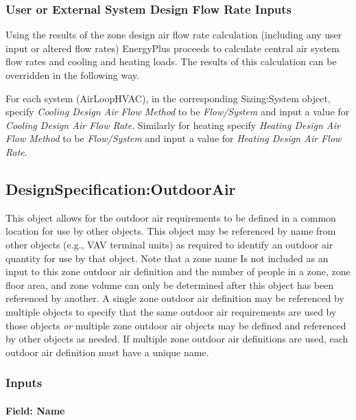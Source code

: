 \subsubsection{User or External System Design Flow Rate Inputs}\label{user-or-external-system-design-flow-rate-inputs}

Using the results of the zone design air flow rate calculation (including any user input or altered flow rates) EnergyPlus proceeds to calculate central air system flow rates and cooling and heating loads. The results of this calculation can be overridden in the following way.

For each system (AirLoopHVAC), in the corresponding Sizing:System object, specify \emph{Cooling Design Air Flow Method} to be \emph{Flow/System} and input a value for \emph{Cooling Design Air Flow Rate}. Similarly for heating specify \emph{Heating Design Air Flow Method} to be \emph{Flow/System} and input a value for \emph{Heating Design Air Flow Rate}.

\subsection{DesignSpecification:OutdoorAir}\label{designspecificationoutdoorair}

This object allows for the outdoor air requirements to be defined in a common location for use by other objects. This object may be referenced by name from other objects (e.g., VAV terminal units) as required to identify an outdoor air quantity for use by that object. Note that a zone name Is not included as an input to this zone outdoor air definition and the number of people in a zone, zone floor area, and zone volume can only be determined after this object has been referenced by another. A single zone outdoor air definition may be referenced by multiple objects to specify that the same outdoor air requirements are used by those objects \emph{or} multiple zone outdoor air objects may be defined and referenced by other objects as needed. If multiple zone outdoor air definitions are used, each outdoor air definition must have a unique name.

\subsubsection{Inputs}\label{inputs-012}

\paragraph{Field: Name}\label{field-name-011}


